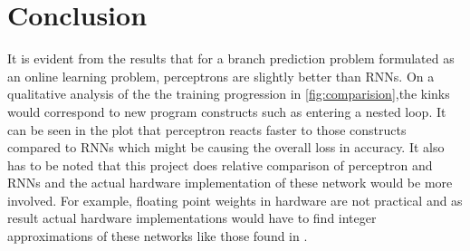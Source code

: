 \documentclass{article}
\begin{document}
\section{Conclusion}
It is evident from the results that for a branch prediction problem formulated as an online learning problem, perceptrons are slightly better than RNNs. On a qualitative analysis of the the training progression in \ref{fig:comparision},the kinks would correspond to new program constructs such as entering a nested loop. It can be seen in the plot that perceptron reacts faster to those constructs compared to RNNs which might be causing the overall loss in accuracy. It also has to be noted that this project does relative comparison of perceptron and RNNs and the actual hardware implementation of these network would be more involved. For example, floating point weights in hardware are not practical and as result actual hardware implementations would have to find integer approximations of these networks like those found in \cite{Jimnez2000DynamicBP}.



\end{document}
